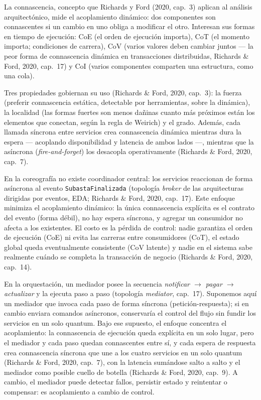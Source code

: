 
La connascencia, concepto que Richards y Ford (2020, cap.~3) aplican al análisis
arquitectónico, mide el acoplamiento dinámico: dos componentes son connascentes si
un cambio en uno obliga a modificar el otro. Interesan sus formas en tiempo de
ejecución: CoE (el orden de ejecución importa), CoT (el momento importa;
condiciones de carrera), CoV (varios valores deben cambiar juntos --- la peor
forma de connascencia dinámica en transacciones distribuidas, Richards \& Ford,
2020, cap.~17) y CoI (varios componentes comparten una estructura, como una cola).

Tres propiedades gobiernan su uso (Richards \& Ford, 2020, cap.~3): la fuerza
(preferir connascencia estática, detectable por herramientas, sobre la dinámica),
la localidad (las formas fuertes son menos dañinas cuanto más próximos están los
elementos que conectan, según la regla de Weirich) y el grado. Además, cada llamada síncrona entre servicios crea connascencia dinámica mientras
dura la espera --- acoplando disponibilidad y latencia de ambos lados ---,
mientras que la asíncrona (\emph{fire-and-forget}) los desacopla operativamente
(Richards \& Ford, 2020, cap.~7).

En la coreografía no existe coordinador central: los servicios reaccionan de forma
asíncrona al evento \texttt{SubastaFinalizada} (topología \emph{broker} de las
arquitecturas dirigidas por eventos, EDA; Richards \& Ford, 2020, cap.~17). Este
enfoque minimiza el acoplamiento dinámico: la única connascencia explícita es
el contrato del evento (forma débil), no hay espera síncrona, y agregar un
consumidor no afecta a los existentes. El costo es la pérdida de control: nadie
garantiza el orden de ejecución (CoE) ni evita las carreras entre consumidores
(CoT), el estado global queda eventualmente consistente (CoV latente) y nadie
en el sistema sabe realmente cuándo se completa la transacción de negocio
(Richards \& Ford, 2020, cap.~14).

En la orquestación, un mediador posee la secuencia \emph{notificar $\rightarrow$
pagar $\rightarrow$ actualizar} y la ejecuta paso a paso (topología
\emph{mediator}, cap.~17). Suponemos aquí un mediador que invoca cada paso de
forma síncrona (petición-respuesta); si en cambio enviara comandos asíncronos,
conservaría el control del flujo sin fundir los servicios en un solo quantum.
Bajo ese supuesto, el enfoque concentra el acoplamiento: la connascencia de
ejecución queda explícita en un solo lugar, pero el mediador y cada paso quedan
connascentes entre sí, y cada espera de respuesta crea connascencia síncrona que
une a los cuatro servicios en un solo quantum (Richards \& Ford, 2020, cap.~7),
con la latencia sumándose salto a salto y el mediador como posible cuello de
botella (Richards \& Ford, 2020, cap.~9). A cambio, el mediador puede detectar
fallos, persistir estado y reintentar o compensar: es acoplamiento a cambio de
control.

